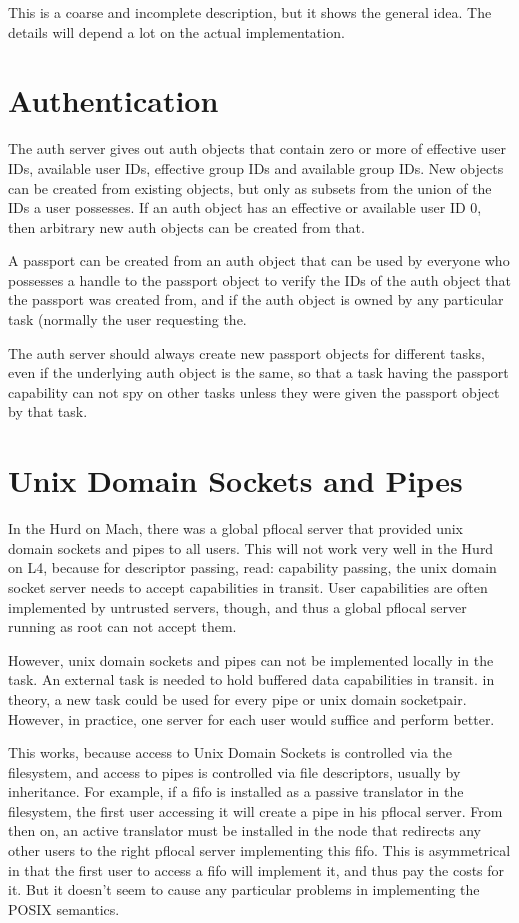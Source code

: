 \documentclass[9pt,a4paper]{extarticle}
\begin{document}
This is a coarse and incomplete description, but it shows the general
idea.  The details will depend a lot on the actual implementation.


\section{Authentication}

The auth server gives out auth objects that contain zero or more of
effective user IDs, available user IDs, effective group IDs and
available group IDs.  New objects can be created from existing
objects, but only as subsets from the union of the IDs a user
possesses.  If an auth object has an effective or available user ID 0,
then arbitrary new auth objects can be created from that.

A passport can be created from an auth object that can be used by
everyone who possesses a handle to the passport object to verify the
IDs of the auth object that the passport was created from, and if the
auth object is owned by any particular task (normally the user
requesting the.

The auth server should always create new passport objects for
different tasks, even if the underlying auth object is the same, so
that a task having the passport capability can not spy on other tasks
unless they were given the passport object by that task.



\section{Unix Domain Sockets and Pipes}

In the Hurd on Mach, there was a global pflocal server that provided
unix domain sockets and pipes to all users.  This will not work very
well in the Hurd on L4, because for descriptor passing, read:
capability passing, the unix domain socket server needs to accept
capabilities in transit.  User capabilities are often implemented by
untrusted servers, though, and thus a global pflocal server running as
root can not accept them.

However, unix domain sockets and pipes can not be implemented locally
in the task.  An external task is needed to hold buffered data
capabilities in transit.  in theory, a new task could be used for
every pipe or unix domain socketpair.  However, in practice, one
server for each user would suffice and perform better.

This works, because access to Unix Domain Sockets is controlled via
the filesystem, and access to pipes is controlled via file
descriptors, usually by inheritance.  For example, if a fifo is
installed as a passive translator in the filesystem, the first user
accessing it will create a pipe in his pflocal server.  From then on,
an active translator must be installed in the node that redirects any
other users to the right pflocal server implementing this fifo.  This
is asymmetrical in that the first user to access a fifo will implement
it, and thus pay the costs for it.  But it doesn't seem to cause any
particular problems in implementing the POSIX semantics.
\end{document}
